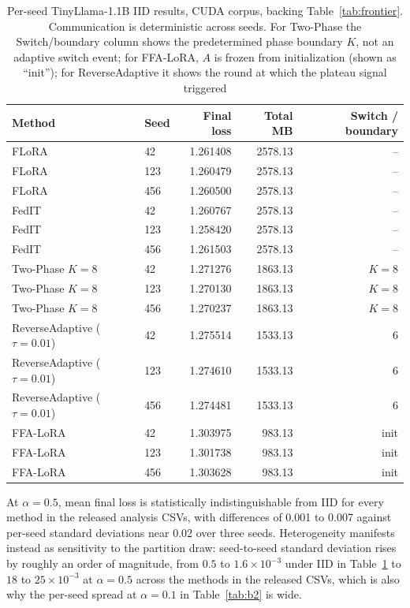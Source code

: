 \documentclass[iicol,pdflatex,sn-mathphys-num]{sn-jnl}
\begin{document}
\begin{appendices}
\begin{table}[tbp]
\centering
\footnotesize
\scriptsize
\renewcommand{\arraystretch}{0.78}
\setlength{\tabcolsep}{6pt}
\caption{Per-seed TinyLlama-1.1B IID results, CUDA corpus, backing Table~\ref{tab:frontier}. Communication is deterministic across seeds. For Two-Phase the Switch/boundary column shows the predetermined phase boundary $K$, not an adaptive switch event; for FFA-LoRA, $A$ is frozen from initialization (shown as ``init''); for ReverseAdaptive it shows the round at which the plateau signal triggered}
\label{tab:b1}
\begin{tabular}{@{}llrrr@{}}
\toprule
Method & Seed & Final loss & Total MB & Switch / boundary \\
\midrule
FLoRA & 42 & 1.261408 & 2578.13 & -- \\
FLoRA & 123 & 1.260479 & 2578.13 & -- \\
FLoRA & 456 & 1.260500 & 2578.13 & -- \\
FedIT & 42 & 1.260767 & 2578.13 & -- \\
FedIT & 123 & 1.258420 & 2578.13 & -- \\
FedIT & 456 & 1.261503 & 2578.13 & -- \\
Two-Phase $K{=}8$ & 42 & 1.271276 & 1863.13 & $K{=}8$ \\
Two-Phase $K{=}8$ & 123 & 1.270130 & 1863.13 & $K{=}8$ \\
Two-Phase $K{=}8$ & 456 & 1.270237 & 1863.13 & $K{=}8$ \\
ReverseAdaptive ($\tau{=}0.01$) & 42 & 1.275514 & 1533.13 & 6 \\
ReverseAdaptive ($\tau{=}0.01$) & 123 & 1.274610 & 1533.13 & 6 \\
ReverseAdaptive ($\tau{=}0.01$) & 456 & 1.274481 & 1533.13 & 6 \\
FFA-LoRA & 42 & 1.303975 & 983.13 & init \\
FFA-LoRA & 123 & 1.301738 & 983.13 & init \\
FFA-LoRA & 456 & 1.303628 & 983.13 & init \\
\bottomrule
\end{tabular}
\end{table}

At $\alpha{=}0.5$, mean final loss is statistically indistinguishable from IID for every method in the released analysis CSVs, with differences of 0.001 to 0.007 against per-seed standard deviations near 0.02 over three seeds. Heterogeneity manifests instead as sensitivity to the partition draw: seed-to-seed standard deviation rises by roughly an order of magnitude, from $0.5$ to $1.6 \times 10^{-3}$ under IID in Table~\ref{tab:b1} to $18$ to $25 \times 10^{-3}$ at $\alpha{=}0.5$ across the methods in the released CSVs, which is also why the per-seed spread at $\alpha{=}0.1$ in Table~\ref{tab:b2} is wide.


\end{appendices}
\end{document}

